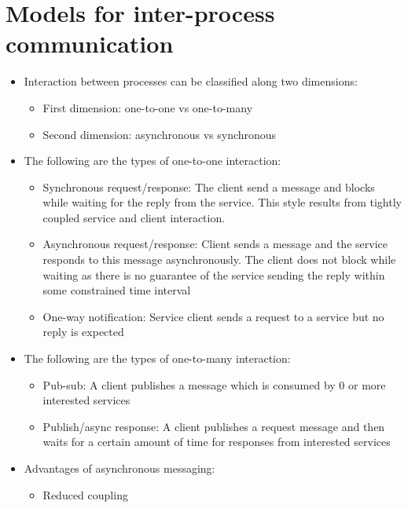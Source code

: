 \documentclass{article}
\begin{document}
\section{Models for inter-process communication}
\begin{itemize}
    \item Interaction between processes can be classified along two dimensions:
    \begin{itemize}
        \item First dimension: one-to-one vs one-to-many
        
        \item Second dimension: asynchronous vs synchronous
    \end{itemize}
    
    \item The following are the types of one-to-one interaction:
    \begin{itemize}
        \item Synchronous request/response: The client send a message and blocks while waiting for the reply from the service. This style results from tightly coupled service and client interaction.
        
        \item Asynchronous request/response: Client sends a message and the service responds to this message asynchronously. The client does not block while waiting as there is no guarantee of the service sending the reply within some constrained time interval
        
        \item One-way notification: Service client sends a request to a service but no reply is expected
    \end{itemize}
    
    \item The following are the types of one-to-many interaction:
    \begin{itemize}
        \item Pub-sub: A client publishes a message which is consumed by 0 or more interested services
        
        \item Publish/async response: A client publishes a request message and then waits for a certain amount of time for responses from interested services
    \end{itemize}
    
    \item Advantages of asynchronous messaging:
    \begin{itemize}
        \item Reduced coupling
        

\end{itemize}
\end{itemize}
\end{document}
